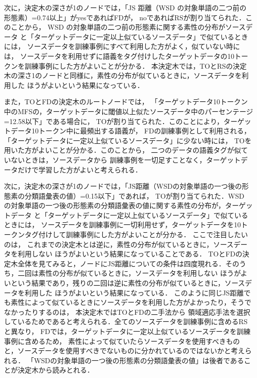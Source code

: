 \documentclass[japanese]{jnlp_1.4}
\begin{document}
次に，決定木の深さが1のノードでは，「JS 距離（WSD の対象単語の二つ前の形態素）=0.74以上」がyesであればFDが，
noであればRSが割り当てられた．このことから，
WSD の対象単語の二つ前の形態素に関する素性の分布がソースデータ
と「ターゲットデータに一定以上似ているソースデータ」で似ているときには，
ソースデータを訓練事例にすべて利用した方がよく，似ていない時には，
ソースデータを利用せずに語義をタグ付けしたターゲットデータの10トークンを訓練事例にした方がよいことが分かる．
本決定木では，TOとRSの決定木の深さ1のノードと同様に，素性の分布が似ているときに，ソースデータを利用した
ほうがよいという結果になっている．

また，TOとFDの決定木のルートノードでは，
「ターゲットデータ10トークン中のMFSの，ターゲットデータに閾値以上似たソースデータ中のパーセンテージ=12.58以下」である場合に，
TOが割り当てられた．このことにより，ターゲットデータ10トークン中に最頻出する語義が，
FDの訓練事例として利用される，「ターゲットデータに一定以上似ているソースデータ」に少ない時には，
TOを用いた方がよいことが分かる．このことから，
二つのデータの語義タグが似ていないときは，ソースデータから
訓練事例を一切足すことなく，ターゲットデータだけで学習した方がよいと考えられる．

次に，決定木の深さが1のノードでは，「JS距離（WSDの対象単語の一つ後の形態素の分類語彙表の値）=0.15以下」であれば，
TOが割り当てられた．WSD の対象単語の一つ後の形態素の分類語彙表の値に関する素性の分布が，ターゲットデータ
と「ターゲットデータに一定以上似ているソースデータ」で似ているときには，
ソースデータを訓練事例に一切利用せず，ターゲットデータを10トークンタグ付けして訓練事例にした方がよいことが分かる．
ここで注目したいのは，
これまでの決定木とは逆に，素性の分布が似ているときに，ソースデータを利用しない
ほうがよいという結果になっていることである．
TOとFDの決定木全体を見てみると，ノードにJS距離についての条件は四度現れる．そのうち，二回は素性の分布が似ているときに，ソースデータを利用しない
ほうがよいという結果であり，残りの二回は逆に素性の分布が似ているときに，ソースデータを利用した
ほうがよいという結果になっている．
このように同じJS距離でも素性によって似ているときにソースデータを利用した方がよかったり，そうでなかったりするのは，
本決定木ではTOとFDの二手法から
領域適応手法を選択しているためであると考えられる．全てのソースデータを訓練事例に含めるRSと異なり，
FDでは，ターゲットデータに一定以上似ているソースデータを訓練事例に含めるため，
素性によって似ていたらソースデータを使用すべきものと，ソースデータを使用すべきでないものに分かれているのではないかと考えられる．
「WSDの対象単語の一つ後の形態素の分類語彙表の値」は後者であることが決定木から読みとれる．
\end{document}
